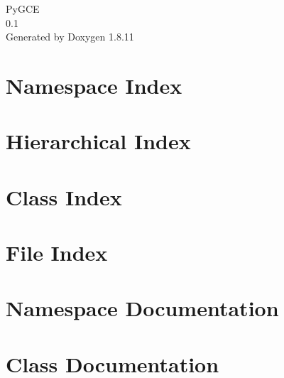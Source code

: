 \documentclass[twoside]{book}
\newcommand{\+}{\discretionary{\mbox{\scriptsize$\hookleftarrow$}}{}{}}
\newcommand{\clearemptydoublepage}{%
  \newpage{\pagestyle{empty}\cleardoublepage}%
}
\begin{document}
\hypersetup{pageanchor=false,
             bookmarksnumbered=true,
             pdfencoding=unicode
            }
\begin{titlepage}
\vspace*{7cm}
\begin{center}%
{\Large Py\+G\+CE \\[1ex]\large 0.\+1 }\\
\vspace*{1cm}
{\large Generated by Doxygen 1.8.11}\\
\end{center}
\end{titlepage}
\clearemptydoublepage
\tableofcontents
\clearemptydoublepage
{}
\hypersetup{pageanchor=true}

\chapter{Namespace Index}

\chapter{Hierarchical Index}

\chapter{Class Index}

\chapter{File Index}

\chapter{Namespace Documentation}











\chapter{Class Documentation}












\end{document}
